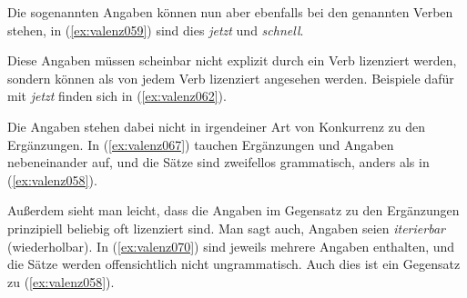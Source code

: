 \begin{exe}
  \ex\label{ex:valenz058}
  \begin{xlist}
  \end{xlist}
\end{exe}

Die sogenannten Angaben können nun aber ebenfalls bei den genannten Verben stehen, in (\ref{ex:valenz059}) sind dies \textit{jetzt} und \textit{schnell}.


\begin{exe}
  \ex\label{ex:valenz059}
  \begin{xlist}
  \end{xlist}
\end{exe}


Diese Angaben müssen scheinbar nicht explizit durch ein Verb lizenziert werden, sondern können als von jedem Verb lizenziert angesehen werden.
Beispiele dafür mit \textit{jetzt} finden sich in (\ref{ex:valenz062}).


\begin{exe}
  \ex\label{ex:valenz062}
  \begin{xlist}
  \end{xlist}
\end{exe}


Die Angaben stehen dabei nicht in irgendeiner Art von Konkurrenz zu den Ergänzungen.
In (\ref{ex:valenz067}) tauchen Ergänzungen und Angaben nebeneinander auf, und die Sätze sind zweifellos grammatisch, anders als in (\ref{ex:valenz058}).


\begin{exe}
  \ex\label{ex:valenz067}
  \begin{xlist}
  \end{xlist}
\end{exe}


Außerdem sieht man leicht, dass die Angaben im Gegensatz zu den Ergänzungen prinzipiell beliebig oft lizenziert sind.
Man sagt auch, Angaben seien \textit{iterierbar} (wiederholbar).
%
In (\ref{ex:valenz070}) sind jeweils mehrere Angaben enthalten, und die Sätze werden offensichtlich nicht ungrammatisch.
Auch dies ist ein Gegensatz zu (\ref{ex:valenz058}).


